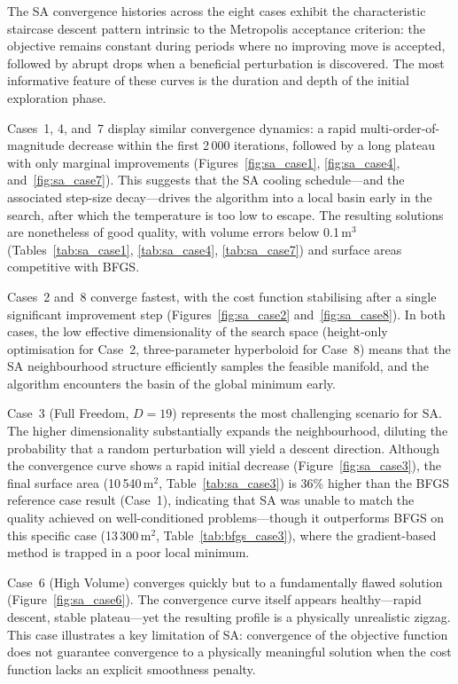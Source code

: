 The SA convergence histories across the eight cases exhibit the characteristic staircase descent pattern intrinsic to the Metropolis acceptance criterion: the objective remains constant during periods where no improving move is accepted, followed by abrupt drops when a beneficial perturbation is discovered. The most informative feature of these curves is the duration and depth of the initial exploration phase.

Cases~1, 4, and~7 display similar convergence dynamics: a rapid multi-order-of-magnitude decrease within the first 2\,000 iterations, followed by a long plateau with only marginal improvements (Figures~\ref{fig:sa_case1}, \ref{fig:sa_case4}, and~\ref{fig:sa_case7}). This suggests that the SA cooling schedule---and the associated step-size decay---drives the algorithm into a local basin early in the search, after which the temperature is too low to escape. The resulting solutions are nonetheless of good quality, with volume errors below 0.1\,m$^3$ (Tables~\ref{tab:sa_case1}, \ref{tab:sa_case4}, \ref{tab:sa_case7}) and surface areas competitive with BFGS.

Cases~2 and~8 converge fastest, with the cost function stabilising after a single significant improvement step (Figures~\ref{fig:sa_case2} and~\ref{fig:sa_case8}). In both cases, the low effective dimensionality of the search space (height-only optimisation for Case~2, three-parameter hyperboloid for Case~8) means that the SA neighbourhood structure efficiently samples the feasible manifold, and the algorithm encounters the basin of the global minimum early.

Case~3 (Full Freedom, $D = 19$) represents the most challenging scenario for SA. The higher dimensionality substantially expands the neighbourhood, diluting the probability that a random perturbation will yield a descent direction. Although the convergence curve shows a rapid initial decrease (Figure~\ref{fig:sa_case3}), the final surface area (10\,540\,m$^2$, Table~\ref{tab:sa_case3}) is 36\% higher than the BFGS reference case result (Case~1), indicating that SA was unable to match the quality achieved on well-conditioned problems---though it outperforms BFGS on this specific case (13\,300\,m$^2$, Table~\ref{tab:bfgs_case3}), where the gradient-based method is trapped in a poor local minimum.

Case~6 (High Volume) converges quickly but to a fundamentally flawed solution (Figure~\ref{fig:sa_case6}). The convergence curve itself appears healthy---rapid descent, stable plateau---yet the resulting profile is a physically unrealistic zigzag. This case illustrates a key limitation of SA: convergence of the objective function does not guarantee convergence to a physically meaningful solution when the cost function lacks an explicit smoothness penalty.

